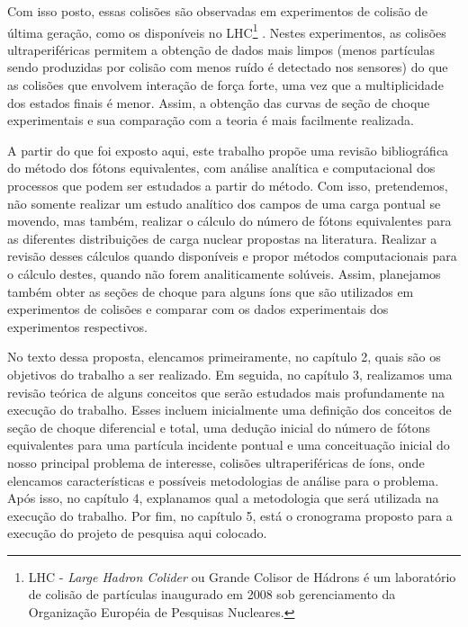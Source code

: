 Com isso posto, essas colisões são observadas em experimentos de colisão de
última geração, como os disponíveis no LHC\footnote{LHC - \textit{Large Hadron
Colider} ou Grande Colisor de Hádrons é um laboratório de colisão de partículas
inaugurado em 2008 sob gerenciamento da Organização Européia de Pesquisas
Nucleares.} \cite{BALTZ20081}. Nestes experimentos, as colisões
ultraperiféricas permitem a obtenção de dados mais limpos (menos partículas
sendo produzidas por colisão com menos ruído é detectado nos sensores) do que
as colisões que envolvem interação de força forte, uma vez que a multiplicidade
dos estados finais é menor. Assim, a obtenção das curvas de seção de choque
experimentais e sua comparação com a teoria é mais facilmente realizada.

A partir do que foi exposto aqui, este trabalho propõe uma revisão
bibliográfica do método dos fótons equivalentes, com análise analítica e
computacional dos processos que podem ser estudados a partir do método. Com
isso, pretendemos, não somente realizar um estudo analítico dos campos de uma
carga pontual se movendo, mas também, realizar o cálculo do número de fótons
equivalentes para as diferentes distribuições de carga nuclear propostas na
literatura. Realizar a revisão desses cálculos quando disponíveis e propor
métodos computacionais para o cálculo destes, quando não forem analiticamente
solúveis. Assim, planejamos também obter as seções de choque para alguns íons
que são utilizados em experimentos de colisões e comparar com os dados
experimentais dos experimentos respectivos.

No texto dessa proposta, elencamos primeiramente, no capítulo 2, quais são os
objetivos do trabalho a ser realizado. Em seguida, no capítulo 3, realizamos
uma revisão teórica de alguns conceitos que serão estudados mais profundamente
na execução do trabalho. Esses incluem inicialmente uma definição dos conceitos
de seção de choque diferencial e total, uma dedução inicial do número de fótons
equivalentes para uma partícula incidente pontual e uma conceituação inicial do
nosso principal problema de interesse, colisões ultraperiféricas de íons, onde
elencamos características e possíveis metodologias de análise para o problema.
Após isso, no capítulo 4, explanamos qual a metodologia que será utilizada na
execução do trabalho. Por fim, no capítulo 5, está o cronograma proposto para a
execução do projeto de pesquisa aqui colocado.



